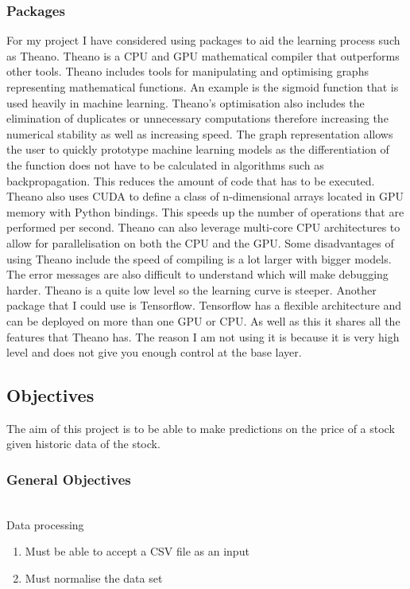 \documentclass{article}
\begin{document}
\subsubsection{Packages}
For my project I have considered using packages to aid the learning process such as Theano. Theano is a CPU and GPU mathematical compiler that outperforms other tools. Theano includes tools for manipulating and optimising graphs representing mathematical functions. An example is the sigmoid function that is used heavily in machine learning. Theano’s optimisation also includes the elimination of duplicates or unnecessary computations therefore increasing the numerical stability as well as increasing speed.  The graph representation allows the user to quickly prototype machine learning models as the differentiation of the function does not have to be calculated in algorithms such as backpropagation. This reduces the amount of code that has to be executed. Theano also uses CUDA to define a class of n-dimensional arrays located in GPU memory with Python bindings. This speeds up the number of operations that are performed per second. Theano can also leverage multi-core CPU architectures to allow for parallelisation on both the CPU and the GPU. Some disadvantages of using Theano include the speed of compiling is a lot larger with bigger models. The error messages are also difficult to understand which will make debugging harder. Theano is a quite low level so the learning curve is steeper.
Another package that I could use is Tensorflow. Tensorflow has a flexible architecture and can be deployed on more than one GPU or CPU. As well as this it shares all the features that Theano has. The reason I am not using it is because it is very high level and does not give you enough control at the base layer.

\subsection{Objectives}
The aim of this project is to be able to make predictions on the price of a stock given historic data of the stock.
\\
\subsubsection{General Objectives}
\\
Data processing
\begin{enumerate}
    \item Must be able to accept a CSV file as an input
    \item Must normalise the data set
\end{enumerate}
\end{document}
